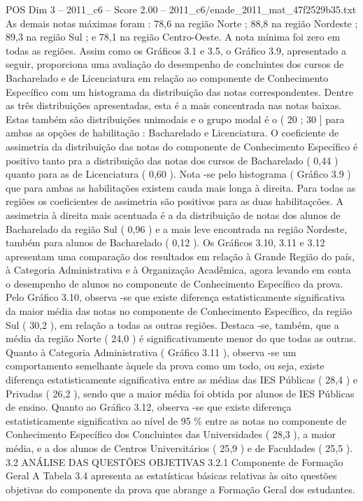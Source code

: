 \begin{textsample}{POS Dim 3 – 2011\_c6 – Score 2.00 – 2011\_c6/enade\_2011\_mat\_47f2529b35.txt}
As demais notas máximas foram : 78,6 na região Norte ; 88,8 na região Nordeste ; 89,3 na região Sul ; e 78,1 na região Centro-Oeste.
A nota mínima foi zero em todas as regiões.
Assim como os Gráficos 3.1 e 3.5, o Gráfico 3.9, apresentado a seguir, proporciona uma avaliação do desempenho de concluintes dos cursos de Bacharelado e de Licenciatura em relação ao componente de Conhecimento Específico com um histograma da distribuição das notas correspondentes.
Dentre as três distribuições apresentadas, esta é a mais concentrada nas notas baixas.
Estas também são distribuições unimodais e o grupo modal é o ( 20 ; 30 ] para ambas as opções de habilitação : Bacharelado e Licenciatura.
O coeficiente de assimetria da distribuição das notas do componente de Conhecimento Específico é positivo tanto pra a distribuição das notas dos cursos de Bacharelado ( 0,44 ) quanto para as de Licenciatura ( 0,60 ).
Nota -se pelo histograma ( Gráfico 3.9 ) que para ambas as habilitações existem cauda mais longa à direita.
Para todas as regiões os coeficientes de assimetria são positivos para as duas habilitaçcões.
A assimetria à direita mais acentuada é a da distribuição de notas dos alunos de Bacharelado da região Sul ( 0,96 ) e a mais leve encontrada na região Nordeste, também para alunos de Bacharelado ( 0,12 ).
Os Gráficos 3.10, 3.11 e 3.12 apresentam uma comparação dos resultados em relação à Grande Região do país, à Categoria Administrativa e à Organização Acadêmica, agora levando em conta o desempenho de alunos no componente de Conhecimento Específico da prova.
Pelo Gráfico 3.10, observa -se que existe diferença estatisticamente significativa da maior média das notas no componente de Conhecimento Específico, da região Sul ( 30,2 ), em relação a todas as outras regiões.
Destaca -se, também, que a média da região Norte ( 24,0 ) é significativamente menor do que todas as outras.
Quanto à Categoria Administrativa ( Gráfico 3.11 ), observa -se um comportamento semelhante àquele da prova como um todo, ou seja, existe diferença estatisticamente significativa entre as médias das IES Públicas ( 28,4 ) e Privadas ( 26,2 ), sendo que a maior média foi obtida por alunos de IES Públicas de ensino.
Quanto ao Gráfico 3.12, observa -se que existe diferença estatisticamente significativa ao nível de 95 \% entre as notas no componente de Conhecimento Específico dos Concluintes das Universidades ( 28,3 ), a maior média, e a dos alunos de Centros Universitários ( 25,9 ) e de Faculdades ( 25,5 ). 3.2 ANÁLISE DAS QUESTÕES OBJETIVAS 3.2.1 Componente de Formação Geral A Tabela 3.4 apresenta as estatísticas básicas relativas às oito questões objetivas do componente da prova que abrange a Formação Geral dos estudantes.

\end{textsample}
